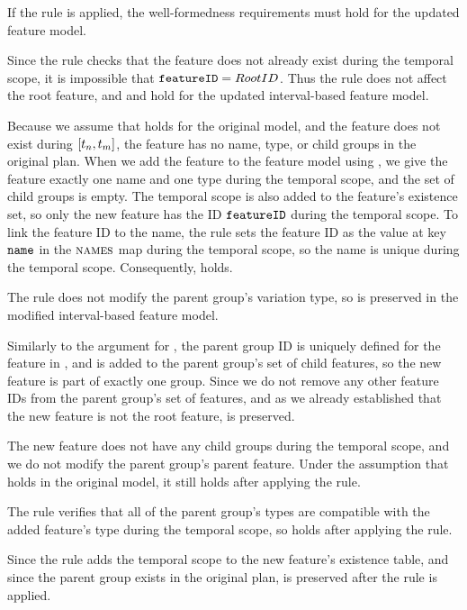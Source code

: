 If the rule is applied, the well-formedness requirements must hold for the updated feature model. 

Since the rule checks that the feature does not already exist during the temporal scope, it is impossible that $\texttt{featureID} = RootID$. Thus the rule does not affect the root feature, and  and  hold for the updated interval-based feature model.

Because we assume that  holds for the original model, and the feature does not exist during $\interval{t_n}{t_m}$, the feature has no name, type, or child groups in the original plan. When we add the feature to the feature model using , we give the feature exactly one name and one type during the temporal scope, and the set of child groups is empty. The temporal scope is also added to the feature's existence set, so only the new feature has the ID $\texttt{featureID}$ during the temporal scope. To link the feature ID to the name, the rule sets the feature ID as the value at key $\texttt{name}$ in the $\textsc{names}{}$ map during the temporal scope, so the name is unique during the temporal scope.
Consequently,  holds.

The rule does not modify the parent group's variation type, so  is preserved in the modified interval-based feature model.

Similarly to the argument for , the parent group ID is uniquely defined for the feature in , and  is added to the parent group's set of child features, so the new feature is part of exactly one group. Since we do not remove any other feature IDs from the parent group's set of features, and as we already established that the new feature is not the root feature,  is preserved.

The new feature does not have any child groups during the temporal scope, and we do not modify the parent group's parent feature. Under the assumption that  holds in the original model, it still holds after applying the  rule.

The rule verifies that all of the parent group's types are compatible with the added feature's type during the temporal scope, so  holds after applying the rule.

Since the rule adds the temporal scope to the new feature's existence table, and since the parent group exists in the original plan,  is preserved after the rule is applied.

